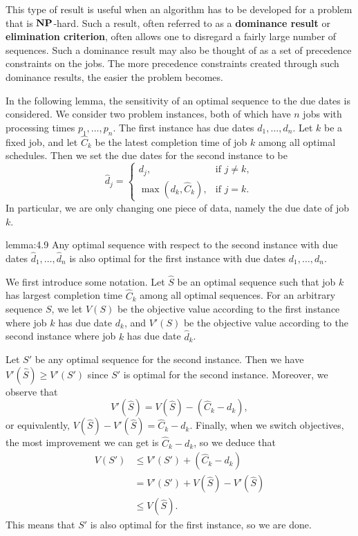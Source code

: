This type of result is useful when an algorithm has to be developed for
a problem that is $\operatorname{\textbf{NP}}$-hard. Such a result, often referred to as a 
{\bf dominance result} or {\bf elimination criterion}, often allows one to
disregard a fairly large number of sequences. Such a dominance result may also 
be thought of as a set of precedence constraints on the jobs. The more 
precedence constraints created through such dominance results, the easier the 
problem becomes.

In the following lemma, the sensitivity of an optimal sequence to the due
dates is considered. We consider two problem instances, both of which have 
$n$ jobs with processing times $p_1, \dots, p_n$. The first instance has 
due dates $d_1, \dots, d_n$. Let $k$ be a fixed job, and let $\hat C_k$ 
be the latest completion time of job $k$ among all optimal schedules. 
Then we set the due dates for the second instance to be 
\[ \hat d_j = \begin{cases}
    d_j, & \text{if } j \neq k, \\ 
    \max(d_k, \hat C_k), & \text{if } j = k.
\end{cases} \] 
In particular, we are only changing one piece of data, namely the 
due date of job $k$. 

\begin{lemma}{lemma:4.9}
    Any optimal sequence with respect to the second instance with due dates 
    $\hat d_1, \dots, \hat d_n$ is also optimal for the first instance 
    with due dates $d_1, \dots, d_n$. 
\end{lemma}
\begin{pf}
    We first introduce some notation. Let $\hat S$ be an optimal sequence 
    such that job $k$ has largest completion time $\hat C_k$ among 
    all optimal sequences. For an arbitrary sequence $S$, we let 
    $V(S)$ be the objective value according to the first instance 
    where job $k$ has due date $d_k$, and $V'(S)$ be the objective 
    value according to the second instance where job $k$ has due date 
    $\hat d_k$. 

    Let $S'$ be any optimal sequence for the second instance. Then we have 
    $V'(\hat S) \geq V'(S')$ since $S'$ is optimal for the second instance. 
    Moreover, we observe that 
    \[ V'(\hat S) = V(\hat S) - (\hat C_k - d_k), \] 
    or equivalently, $V(\hat S) - V'(\hat S) = \hat C_k - d_k$. Finally, 
    when we switch objectives, the most improvement we can get is 
    $\hat C_k - d_k$, so we deduce that 
    \begin{align*}
        V(S') &\leq V'(S') + (\hat C_k - d_k) \\ 
        &= V'(S') + V(\hat S) - V'(\hat S) \\ 
        &\leq V(\hat S).
    \end{align*}
    This means that $S'$ is also optimal for the first instance, so we are done. 
\end{pf}

